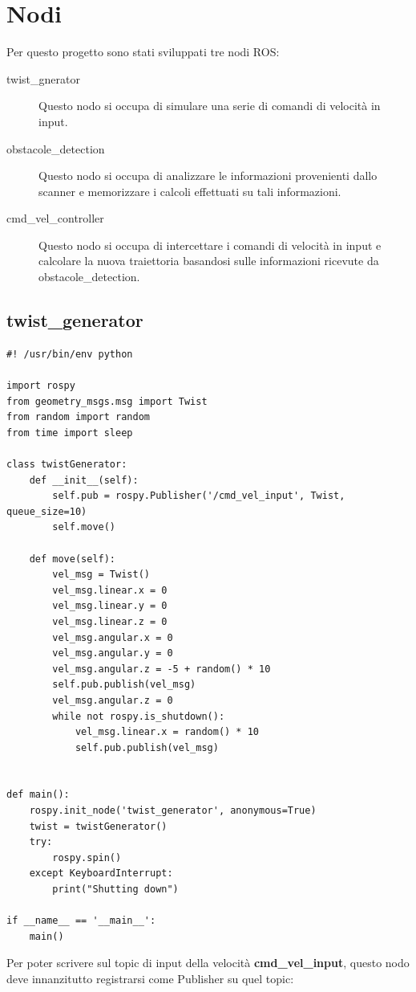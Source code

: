 \documentclass[Lau, binding=0.6cm, oneside]{sapthesis}
\begin{document}
\section{Nodi}
Per questo progetto sono stati sviluppati tre nodi ROS:
\begin{description}
	\item[twist\_gnerator] Questo nodo si occupa di simulare una serie di comandi di velocità in input.
	\item[obstacole\_detection] Questo nodo si occupa di analizzare le informazioni provenienti dallo scanner e memorizzare i calcoli effettuati su tali informazioni.
	\item[cmd\_vel\_controller] Questo nodo si occupa di intercettare i comandi di velocità in input e calcolare la nuova traiettoria basandosi sulle informazioni ricevute da obstacole\_detection.
\end{description}

\subsection{twist\_generator}
\begin{lstlisting}
#! /usr/bin/env python

import rospy
from geometry_msgs.msg import Twist
from random import random
from time import sleep

class twistGenerator:
    def __init__(self):
        self.pub = rospy.Publisher('/cmd_vel_input', Twist, queue_size=10)
        self.move()
    
    def move(self):
        vel_msg = Twist()
        vel_msg.linear.x = 0
        vel_msg.linear.y = 0
        vel_msg.linear.z = 0
        vel_msg.angular.x = 0
        vel_msg.angular.y = 0
        vel_msg.angular.z = -5 + random() * 10
        self.pub.publish(vel_msg)
        vel_msg.angular.z = 0
        while not rospy.is_shutdown():
            vel_msg.linear.x = random() * 10
            self.pub.publish(vel_msg)


def main():
    rospy.init_node('twist_generator', anonymous=True)
    twist = twistGenerator()
    try:
        rospy.spin()
    except KeyboardInterrupt:
        print("Shutting down")

if __name__ == '__main__':
    main()
\end{lstlisting}

Per poter scrivere sul topic di input della velocità \textbf{cmd\_vel\_input}, questo nodo deve innanzitutto registrarsi come Publisher su quel topic:
\end{document}
